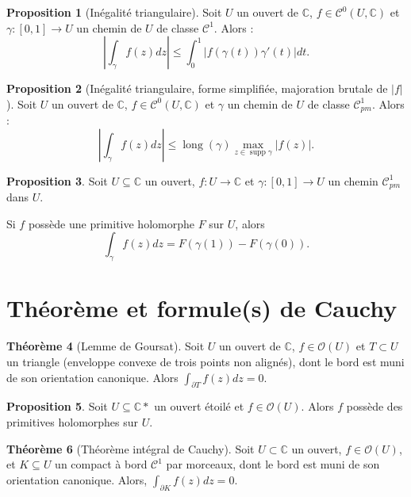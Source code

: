 \documentclass[11pt,a4paper]{article}
\newcommand{\C}{\mathbb{C}}
\DeclareMathOperator{\supp}{supp}
\theoremstyle{definition}
\newtheorem{theoreme}{Th\'eor\`eme}[section]
\newtheorem{proposition}[theoreme]{Proposition}
\newtheorem{prop}[theoreme]{Proposition}
\theoremstyle{plain}
\begin{document}
\begin{prop}[Inégalité triangulaire]
Soit $U$ un ouvert de $\C$, $f\in \mathcal C^0(U,\C)$ et $\gamma:[0,1]\to U$ un chemin de $U$ de classe $\mathcal C^1$.
Alors :
\[ \left| \int_\gamma f(z)dz\right| \leq \int_0^1 \left|f(\gamma(t))\gamma'(t)\right|dt.\]
\end{prop}

\begin{prop}[Inégalité triangulaire, forme simplifiée, majoration brutale de $|f|$]
Soit $U$ un ouvert de $\C$, $f\in \mathcal C^0(U,\C)$ et $\gamma$ un chemin de $U$ de classe $\mathcal C^1_{pm}$.
Alors :
\[ \left| \int_\gamma f(z)dz\right| \leq \operatorname{long}(\gamma)\max_{z\in \supp \gamma}|f(z)|.\]
\end{prop}

\begin{proposition}
Soit $U\subseteq \C$ un ouvert, $f:U\to\C$  et $\gamma : [0,1]\to U$ un chemin $\mathcal C^1_{pm}$ dans $U$.

Si $f$ possède une primitive holomorphe $F$ sur $U$, alors  
\[\int_\gamma f(z)dz = F(\gamma(1)) - F(\gamma(0)).\]
\end{proposition}





\section{Théorème et formule(s) de Cauchy}

\begin{theoreme}[Lemme de Goursat]
Soit $U$ un ouvert de $\C$,  $f\in \mathcal O(U)$ et $T\subset U$ un triangle (enveloppe convexe de trois points non alignés), dont le bord est muni de son orientation canonique.
Alors $\int_{\partial T} f(z)dz=0$.
\end{theoreme}

\begin{prop}
Soit $U\subseteq \C*$ un ouvert étoilé et $f\in \mathcal O(U)$.
Alors $f$ possède des primitives holomorphes sur $U$.
\end{prop}

\begin{theoreme}[Théorème intégral de Cauchy]
Soit $U\subset \C$ un ouvert, $f\in \mathcal O(U)$, et $K\subseteq U$ un compact à bord $\mathcal C^1$ par morceaux, dont le bord est muni de son orientation canonique.
Alors, $\int_{\partial K} f(z)dz = 0$.
\end{theoreme}
\end{document}
